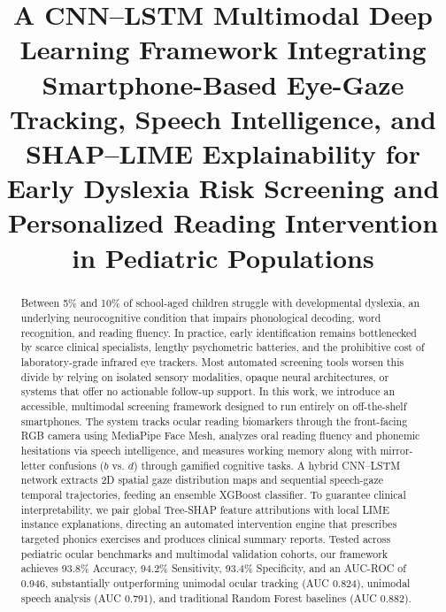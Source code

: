 \documentclass[conference]{IEEEtran}
\begin{document}
\title{A CNN--LSTM Multimodal Deep Learning Framework Integrating Smartphone-Based Eye-Gaze Tracking, Speech Intelligence, and SHAP--LIME Explainability for Early Dyslexia Risk Screening and Personalized Reading Intervention in Pediatric Populations}

\author{
\and
{}
}

\maketitle

\begin{abstract}
Between 5\% and 10\% of school-aged children struggle with developmental dyslexia, an underlying neurocognitive condition that impairs phonological decoding, word recognition, and reading fluency. In practice, early identification remains bottlenecked by scarce clinical specialists, lengthy psychometric batteries, and the prohibitive cost of laboratory-grade infrared eye trackers. Most automated screening tools worsen this divide by relying on isolated sensory modalities, opaque neural architectures, or systems that offer no actionable follow-up support. In this work, we introduce an accessible, multimodal screening framework designed to run entirely on off-the-shelf smartphones. The system tracks ocular reading biomarkers through the front-facing RGB camera using MediaPipe Face Mesh, analyzes oral reading fluency and phonemic hesitations via speech intelligence, and measures working memory along with mirror-letter confusions ($b$ vs. $d$) through gamified cognitive tasks. A hybrid CNN--LSTM network extracts 2D spatial gaze distribution maps and sequential speech-gaze temporal trajectories, feeding an ensemble XGBoost classifier. To guarantee clinical interpretability, we pair global Tree-SHAP feature attributions with local LIME instance explanations, directing an automated intervention engine that prescribes targeted phonics exercises and produces clinical summary reports. Tested across pediatric ocular benchmarks and multimodal validation cohorts, our framework achieves 93.8\% Accuracy, 94.2\% Sensitivity, 93.4\% Specificity, and an AUC-ROC of 0.946, substantially outperforming unimodal ocular tracking (AUC 0.824), unimodal speech analysis (AUC 0.791), and traditional Random Forest baselines (AUC 0.882).
\end{abstract}
\end{document}
